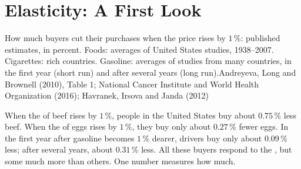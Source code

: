 \chapter{Elasticity: A First Look}\label{ch:g9:elasticity-first-look}

\begin{openingchart}{How much buyers cut their purchases when the price rises by $1\,\%$: published
estimates, in percent. Foods: averages of United States studies, 1938--2007. Cigarettes: rich
countries. Gasoline: averages of studies from many countries, in the first year (short run) and after
several years (long run).}{Andreyeva, Long and Brownell (2010), Table 1; National Cancer Institute and
World Health Organization (2016); Havranek, Irsova and Janda (2012)}
\end{openingchart}

When the  of beef rises by $1\,\%$, people in the United States buy about $0.75\,\%$ less beef. When
the  of eggs rises by $1\,\%$, they buy only about $0.27\,\%$ fewer eggs. In the first year after
gasoline becomes $1\,\%$ dearer, drivers buy only about $0.09\,\%$ less; after several years, about
$0.31\,\%$ less. All these buyers respond to the , but some much more than others. One number
measures how much.


